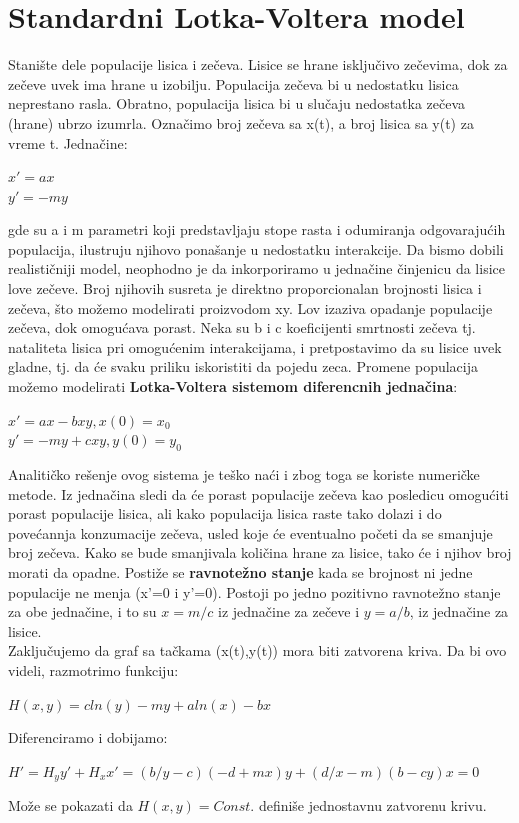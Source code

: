 \documentclass[a4paper]{article}
\begin{document}
\section{Standardni Lotka-Voltera model}
\label{sec:std_model}
Stanište dele populacije lisica i zečeva. Lisice se hrane isključivo zečevima,
dok za zečeve uvek ima hrane u izobilju. Populacija zečeva bi u nedostatku lisica
neprestano rasla. Obratno, populacija lisica bi u slučaju nedostatka zečeva (hrane) ubrzo izumrla.
Označimo broj zečeva sa x(t), a broj lisica sa y(t) za vreme t.
Jednačine:
	\begin{center}
	$x' = ax$ \\
	$y' = -my$
	\end{center}
gde su a i m parametri koji predstavljaju stope rasta i odumiranja odgovarajućih populacija,
ilustruju njihovo ponašanje u nedostatku interakcije.
Da bismo dobili realističniji model, neophodno je da inkorporiramo u jednačine
činjenicu da lisice love zečeve. Broj njihovih susreta je direktno proporcionalan
brojnosti lisica i zečeva, što možemo modelirati proizvodom xy. Lov izaziva opadanje
populacije zečeva, dok omogućava porast. Neka su b i c koeficijenti smrtnosti zečeva tj.
nataliteta lisica pri omogućenim interakcijama, i pretpostavimo da su lisice uvek gladne,
tj. da će svaku priliku iskoristiti da pojedu zeca.
Promene populacija možemo modelirati \textbf{Lotka-Voltera sistemom diferencnih jednačina}:
		\begin{center}
		$x' = ax - bxy,   x(0)=x_0$\\
		$y' = -my + cxy,  y(0)=y_0$
		\end{center}

Analitičko rešenje ovog sistema je teško naći i zbog toga se koriste numeričke metode.
Iz jednačina sledi da će porast populacije zečeva kao posledicu omogućiti porast populacije lisica,
ali kako populacija lisica raste tako dolazi i do povećannja konzumacije zečeva, usled koje će eventualno
početi da se smanjuje broj zečeva.
Kako se bude smanjivala količina hrane za lisice, tako će i njihov broj morati da opadne.
Postiže se \textbf{ravnotežno stanje} kada se brojnost ni jedne populacije ne menja (x'=0 i y'=0).
Postoji po jedno pozitivno ravnotežno stanje za obe jednačine, i to su $x=m/c$ iz jednačine za zečeve i $y=a/b$, iz jednačine za lisice.\\
Zaključujemo da  graf sa tačkama (x(t),y(t)) mora biti zatvorena kriva.
Da bi ovo videli, razmotrimo funkciju:
\begin{center}
	$H(x,y)=c ln(y) - my + a ln(x) - bx$
\end{center}
Diferenciramo i dobijamo:
\begin{center}
	$H'=H_y y' + H_x x' = (b/y - c)(-d + mx)y + (d/x - m)(b - cy)x = 0$
\end{center}
Može se pokazati da $H(x,y)=Const.$ definiše jednostavnu zatvorenu krivu.
\end{document}
